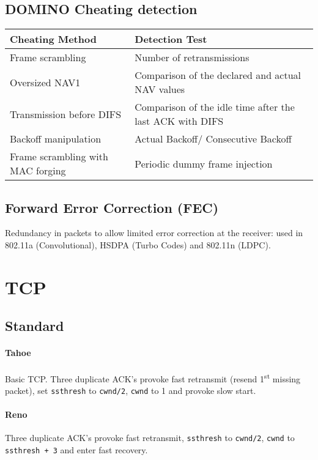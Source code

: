 \documentclass[6pt]{scrartcl}
\begin{document}
\begin{multicols}{4}
\subsection{DOMINO Cheating detection}
\begin{tabular}{|p{}|p{}|}
  \hline
  Cheating Method & Detection Test \\\hline
  Frame scrambling & Number of retransmissions \\
  Oversized NAV1 & Comparison of the declared and actual NAV values\\
  Transmission before DIFS & Comparison of the idle time after the last ACK with DIFS \\
  Backoff manipulation & Actual Backoff/ Consecutive Backoff \\
  Frame scrambling with MAC forging & Periodic dummy frame injection\\
   \hline
\end{tabular}

\subsection{Forward Error Correction (FEC)}
Redundancy in packets to allow limited error correction at the receiver: used in 802.11a (Convolutional), HSDPA (Turbo Codes) and 802.11n (LDPC).

\section{TCP}

\subsection{Standard}

\paragraph{Tahoe} Basic TCP. Three duplicate ACK's provoke fast retransmit (resend 1\textsuperscript{st} missing packet), set \texttt{ssthresh} to \texttt{cwnd/2}, \texttt{cwnd} to 1 and provoke slow start.

\paragraph{Reno} Three duplicate ACK's provoke fast retransmit, \texttt{ssthresh} to \texttt{cwnd/2}, \texttt{cwnd} to \texttt{ssthresh + 3} and enter fast recovery.


\end{multicols}
\end{document}
